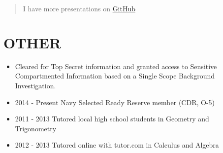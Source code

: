 \documentclass[10pt]{article}
\def\tightlist{}
\begin{document}
\begin{quote}
I have more presentations on \href{https://github.com/?q=slides}{GitHub}
\end{quote}

\hypertarget{other}{%
\section{OTHER}\label{other}}

\begin{itemize}
\tightlist
\item
  Cleared for Top Secret information and granted access to Sensitive
  Compartmented Information based on a Single Scope Background
  Investigation.
\item
  2014 - Present Navy Selected Ready Reserve member (CDR, O-5)
\item
  2011 - 2013 Tutored local high school students in Geometry and
  Trigonometry
\item
  2012 - 2013 Tutored online with tutor.com in Calculus and Algebra
\end{itemize}

\end{document}
